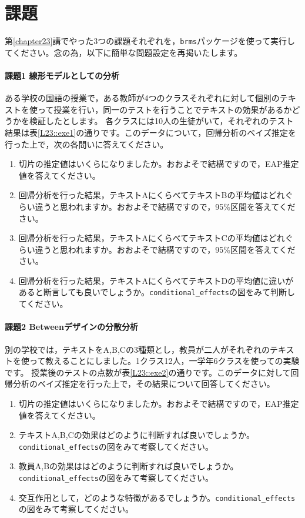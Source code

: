 \documentclass{ltjsarticle}
\begin{document}
\section{課題}
第\ref{chapter23}講でやった3つの課題それぞれを，\texttt{brms}パッケージを使って実行してください。念の為，以下に簡単な問題設定を再掲いたします。
\paragraph{課題1 線形モデルとしての分析}
ある学校の国語の授業で，ある教師が4つのクラスそれぞれに対して個別のテキストを使って授業を行い，同一のテストを行うことでテキストの効果があるかどうかを検証したとします。
各クラスには10人の生徒がいて，それぞれのテスト結果は表\ref{L23::exe1}の通りです。このデータについて，回帰分析のベイズ推定を行った上で，次の各問いに答えてください。

\begin{enumerate}
	\item 切片の推定値はいくらになりましたか。おおよそで結構ですので，EAP推定値を答えてください。
	\item 回帰分析を行った結果，テキストAにくらべてテキストBの平均値はどれぐらい違うと思われますか。おおよそで結構ですので，95\%区間を答えてください。
	\item 回帰分析を行った結果，テキストAにくらべてテキストCの平均値はどれぐらい違うと思われますか。おおよそで結構ですので，95\%区間を答えてください。
	\item 回帰分析を行った結果，テキストAにくらべてテキストDの平均値に違いがあると断言しても良いでしょうか。\verb|conditional_effects|の図をみて判断してください。
\end{enumerate}


\paragraph{課題2 Betweenデザインの分散分析}
別の学校では，テキストをA,B,Cの3種類とし，教員が二人がそれぞれのテキストを使って教えることにしました。1クラス12人，一学年6クラスを使っての実験です。
授業後のテストの点数が表\ref{L23::exe2}の通りです。このデータに対して回帰分析のベイズ推定を行った上で，その結果について回答してください。

\begin{enumerate}
	\item 切片の推定値はいくらになりましたか。おおよそで結構ですので，EAP推定値を答えてください。
	\item テキストA,B,Cの効果はどのように判断すれば良いでしょうか。\verb|conditional_effects|の図をみて考察してください。
	\item 教員A,Bの効果ははどのように判断すれば良いでしょうか。\verb|conditional_effects|の図をみて考察してください。
	\item 交互作用として，どのような特徴があるでしょうか。\verb|conditional_effects|の図をみて考察してください。
\end{enumerate}
\end{document}
